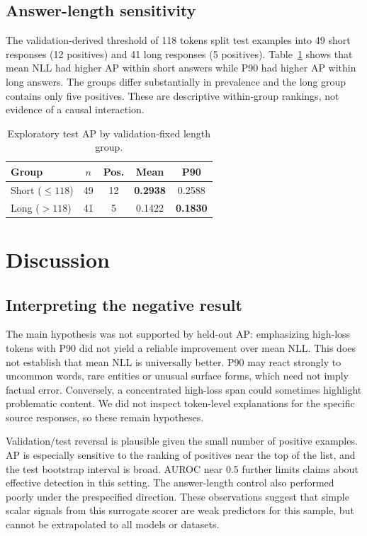 \documentclass[manuscript,screen]{acmart}
\begin{document}
\subsection{Answer-length sensitivity}
The validation-derived threshold of 118 tokens split test examples into 49 short responses (12 positives) and 41 long responses (5 positives). Table~\ref{tab:length} shows that mean NLL had higher AP within short answers while P90 had higher AP within long answers. The groups differ substantially in prevalence and the long group contains only five positives. These are descriptive within-group rankings, not evidence of a causal interaction.
\begin{table}[t]
\caption{Exploratory test AP by validation-fixed length group.}\label{tab:length}
\centering\begin{tabular}{lcccc}\toprule
Group & $n$ & Pos. & Mean & P90\\\midrule
Short ($\leq118$) & 49 & 12 & \textbf{0.2938} & 0.2588\\
Long ($>118$) & 41 & 5 & 0.1422 & \textbf{0.1830}\\\bottomrule
\end{tabular}
\end{table}

\section{Discussion}
\subsection{Interpreting the negative result}
The main hypothesis was not supported by held-out AP: emphasizing high-loss tokens with P90 did not yield a reliable improvement over mean NLL. This does not establish that mean NLL is universally better. P90 may react strongly to uncommon words, rare entities or unusual surface forms, which need not imply factual error. Conversely, a concentrated high-loss span could sometimes highlight problematic content. We did not inspect token-level explanations for the specific source responses, so these remain hypotheses.

Validation/test reversal is plausible given the small number of positive examples. AP is especially sensitive to the ranking of positives near the top of the list, and the test bootstrap interval is broad. AUROC near 0.5 further limits claims about effective detection in this setting. The answer-length control also performed poorly under the prespecified direction. These observations suggest that simple scalar signals from this surrogate scorer are weak predictors for this sample, but cannot be extrapolated to all models or datasets.
\end{document}
